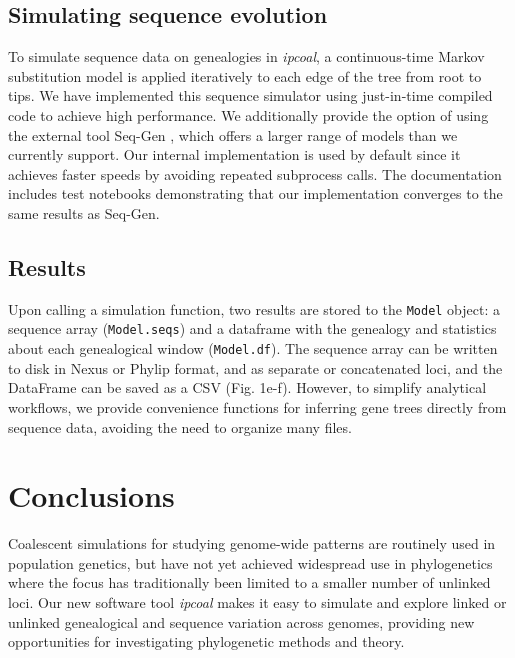 \documentclass[11pt]{article}
\begin{document}
\subsection{Simulating sequence evolution}
To simulate sequence data on genealogies in \emph{ipcoal}, a continuous-time Markov substitution model is applied iteratively to each edge of the tree from root to tips. We have implemented this sequence simulator using just-in-time compiled code to achieve high performance. We additionally provide the option of using the external tool Seq-Gen \citep{rambaut_seqgen_1997}, which offers a larger range of models than we currently support. Our internal implementation is used by default since it achieves faster speeds by avoiding repeated subprocess calls. The documentation includes test notebooks demonstrating that our implementation converges to the same results as Seq-Gen.

\subsection{Results}
Upon calling a simulation function, two results are stored to the \texttt{Model} object: a sequence array (\texttt{Model.seqs}) and a dataframe with the genealogy and statistics about each genealogical window (\texttt{Model.df}). The sequence array can be written to disk in Nexus or Phylip format, and as separate or concatenated loci, and the DataFrame can be saved as a CSV (Fig. 1e-f). However, to simplify analytical workflows, we provide convenience functions for inferring gene trees directly from sequence data, avoiding the need to organize many files.

\section{Conclusions}
\label{sec:conclusions}
Coalescent simulations for studying genome-wide patterns are routinely used in population genetics, but have not yet achieved widespread use in phylogenetics where the focus has traditionally been limited to a smaller number of unlinked loci. Our new software tool \emph{ipcoal} makes it easy to simulate and explore linked or unlinked genealogical and sequence variation across genomes, providing new opportunities for investigating phylogenetic methods and theory.
\end{document}
